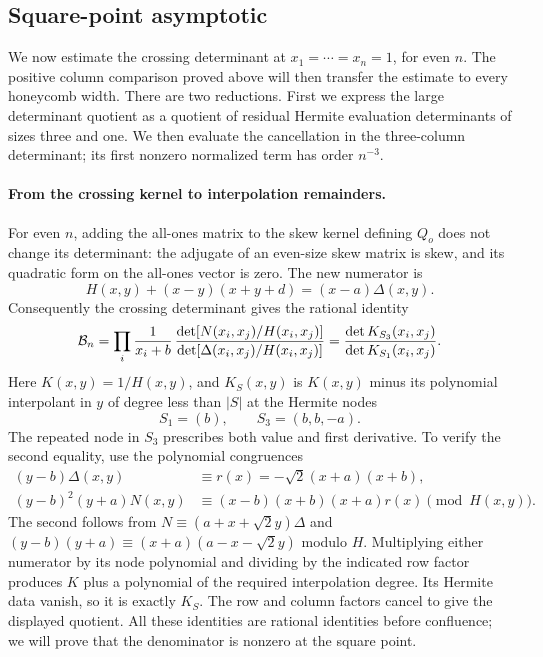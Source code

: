 \subsection{Square-point asymptotic}\label{L:step9}

We now estimate the crossing determinant at $x_1=\cdots=x_n=1$,
for even $n$. The positive column comparison proved above will then
transfer the estimate to every honeycomb width. There are two reductions.
First we express the large determinant quotient as a quotient of residual
Hermite evaluation determinants of sizes three and one. We then evaluate
the cancellation in the three-column determinant; its first nonzero
normalized term has order $n^{-3}$.

\paragraph{From the crossing kernel to interpolation remainders.}
For even $n$, adding the all-ones matrix to the skew kernel defining
$Q_o$ does not change its determinant: the adjugate of an even-size skew
matrix is skew, and its quadratic form on the all-ones vector is zero.
The new numerator is
\[
 H(x,y)+(x-y)(x+y+d)=(x-a)\Delta(x,y).
\]
Consequently the crossing determinant gives the rational identity
\[
 {\cal B}_n
 =\prod_i\frac1{x_i+b}\,
   \frac{\det[N(x_i,x_j)/H(x_i,x_j)]}
        {\det[\Delta(x_i,x_j)/H(x_i,x_j)]}
 =\frac{\det K_{S_3}(x_i,x_j)}{\det K_{S_1}(x_i,x_j)}.
\]
Here $K(x,y)=1/H(x,y)$, and $K_S(x,y)$ is $K(x,y)$ minus its
polynomial interpolant in $y$ of degree less than $|S|$ at the Hermite
nodes
\[
 S_1=(b),\qquad S_3=(b,b,-a).
\]
The repeated node in $S_3$ prescribes both value and first derivative.
To verify the second equality, use the polynomial congruences
\[
\begin{split}
 (y-b)\Delta(x,y)&\equiv r(x)=-\sqrt2(x+a)(x+b),\\
 (y-b)^2(y+a)N(x,y)&\equiv(x-b)(x+b)(x+a)r(x)
 \pmod{H(x,y)}.
\end{split}
\]
The second follows from $N\equiv(a+x+\sqrt2y)\Delta$ and
$(y-b)(y+a)\equiv(x+a)(a-x-\sqrt2y)$ modulo $H$.
Multiplying either numerator by its node polynomial and dividing by the
indicated row factor produces $K$ plus a polynomial of the required
interpolation degree. Its Hermite data vanish, so it is exactly $K_S$.
The row and column factors cancel to give the displayed quotient.
All these identities are rational identities before confluence; we will
prove that the denominator is nonzero at the square point.

